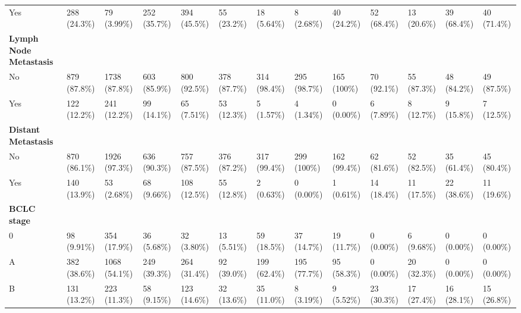 \documentclass{article}
\begin{document}
\begin{landscape}
\begin{tiny}
\begin{tabularx}{\linewidth}{p{2.0cm}|X|X|X|X|X|X|X|X|X|X|X|X}
\rowcolor{gray!10}
    Yes &   288 (24.3\%)    &    79 (3.99\%)    &   252 (35.7\%)    &   394 (45.5\%)    &    55 (23.2\%)    &    18 (5.64\%)    &    8 (2.68\%)     &    40 (24.2\%)    &    52 (68.4\%)    &    13 (20.6\%)    &    39 (68.4\%)    &    40 (71.4\%)    \\
\rowcolor{gray!30}
\textbf{Lymph Node Metastasis }  &  &  &  &  &  &  &  &  &  &  &  &  \\
\rowcolor{gray!10}
    No &   879 (87.8\%)    &   1738 (87.8\%)   &   603 (85.9\%)    &   800 (92.5\%)    &   378 (87.7\%)    &   314 (98.4\%)    &   295 (98.7\%)    &    165 (100\%)    &    70 (92.1\%)    &    55 (87.3\%)    &    48 (84.2\%)    &    49 (87.5\%)    \\
\rowcolor{gray!10}
    Yes &   122 (12.2\%)    &   241 (12.2\%)    &    99 (14.1\%)    &    65 (7.51\%)    &    53 (12.3\%)    &    5 (1.57\%)     &    4 (1.34\%)     &    0 (0.00\%)     &    6 (7.89\%)     &    8 (12.7\%)     &    9 (15.8\%)     &    7 (12.5\%)     \\
\rowcolor{gray!30}
\textbf{Distant Metastasis }  &  &  &  &  &  &  &  &  &  &  &  &  \\
\rowcolor{gray!10}
    No &   870 (86.1\%)    &   1926 (97.3\%)   &   636 (90.3\%)    &   757 (87.5\%)    &   376 (87.2\%)    &   317 (99.4\%)    &    299 (100\%)    &   162 (99.4\%)    &    62 (81.6\%)    &    52 (82.5\%)    &    35 (61.4\%)    &    45 (80.4\%)    \\
\rowcolor{gray!10}
    Yes &   140 (13.9\%)    &    53 (2.68\%)    &    68 (9.66\%)    &   108 (12.5\%)    &    55 (12.8\%)    &    2 (0.63\%)     &    0 (0.00\%)     &    1 (0.61\%)     &    14 (18.4\%)    &    11 (17.5\%)    &    22 (38.6\%)    &    11 (19.6\%)    \\
\rowcolor{gray!30}
\textbf{BCLC stage }  &  &  &  &  &  &  &  &  &  &  &  &  \\
\rowcolor{gray!10}
    0 &    98 (9.91\%)    &   354 (17.9\%)    &    36 (5.68\%)    &    32 (3.80\%)    &    13 (5.51\%)    &    59 (18.5\%)    &    37 (14.7\%)    &    19 (11.7\%)    &    0 (0.00\%)     &    6 (9.68\%)     &    0 (0.00\%)     &    0 (0.00\%)     \\
\rowcolor{gray!10}
    A &   382 (38.6\%)    &   1068 (54.1\%)   &   249 (39.3\%)    &   264 (31.4\%)    &    92 (39.0\%)    &   199 (62.4\%)    &   195 (77.7\%)    &    95 (58.3\%)    &    0 (0.00\%)     &    20 (32.3\%)    &    0 (0.00\%)     &    0 (0.00\%)     \\
\rowcolor{gray!10}
    B &   131 (13.2\%)    &   223 (11.3\%)    &    58 (9.15\%)    &   123 (14.6\%)    &    32 (13.6\%)    &    35 (11.0\%)    &    8 (3.19\%)     &    9 (5.52\%)     &    23 (30.3\%)    &    17 (27.4\%)    &    16 (28.1\%)    &    15 (26.8\%)    \\

\end{tabularx}
\end{tiny}
\end{landscape}
\end{document}
